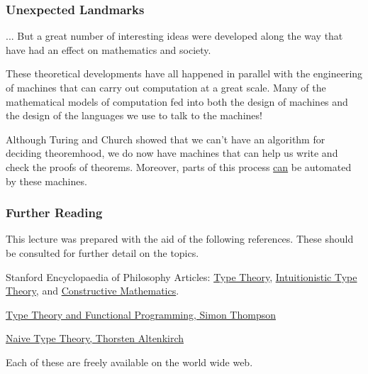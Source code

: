 \documentclass{beamer}
\theoremstyle{indentDefn} \newtheorem{defn}[]{Definition}
\begin{document}
\begin{frame}
  \frametitle{Unexpected Landmarks}

  ... But a great number of interesting ideas were developed along the way that have had an effect on mathematics and society. 

  These theoretical developments have all happened in parallel with the engineering of machines that can carry out computation at a great scale. Many of the mathematical models of computation fed into both the design of machines and the design of the languages we use to talk to the machines!

  Although Turing and Church showed that we can't have an algorithm for deciding theoremhood, we do now have machines that can help us write and check the proofs of theorems. Moreover, parts of this process \underline{can} be automated by these machines. 
\end{frame}


\begin{frame}
	\frametitle{Further Reading}
	
    This lecture was prepared with the aid of the following references. 
    These should be consulted for further detail on the topics. 
    
    Stanford Encyclopaedia of Philosophy Articles: \href{https://plato.stanford.edu/entries/type-theory/}{Type Theory}, \href{https://plato.stanford.edu/entries/type-theory-intuitionistic/}{Intuitionistic Type Theory}, and \href{https://plato.stanford.edu/entries/mathematics-constructive/}{Constructive Mathematics}. 
    
    \href{https://www.cs.kent.ac.uk/people/staff/sjt/TTFP/}{Type Theory and Functional Programming, Simon Thompson}
    
    \href{https://people.cs.nott.ac.uk/psztxa/publ/fomus19.pdf}{Naive Type Theory, Thorsten Altenkirch}
    
    Each of these are freely available on the world wide web.
    
    \vspace{50mm}    
	
\end{frame}
\end{document}
